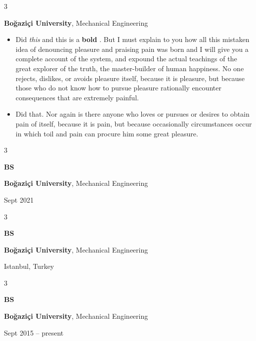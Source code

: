 \documentclass[10pt, letterpaper]{article}
\newenvironment{highlights}{
    \begin{itemize}[
        topsep=0.10 cm,
        parsep=0.10 cm,
        partopsep=0pt,
        itemsep=0pt,
        leftmargin=0.4 cm + 10pt
    ]
}{
    \end{itemize}
} %
\newenvironment{threecolentry}[3][]{
    \onecolentry
    \def\thirdColumn{#3}
    \setcolumnwidth{1 cm, \fill, 4.5 cm}
    \begin{paracol}{3}
    {\raggedright #2} \switchcolumn
}{
    \switchcolumn \raggedleft \thirdColumn
    \end{paracol}
    \endonecolentry
} %
\let\hrefWithoutArrow\href
\renewcommand{\href}[2]{\hrefWithoutArrow{#1}{\ifthenelse{\equal{#2}{}}{ }{#2 }\raisebox{.15ex}{\footnotesize \faExternalLink*}}}
\begin{document}
        \begin{threecolentry}{\textbf{}}{
            
        }
            \textbf{Boğaziçi University}, Mechanical Engineering
            \begin{highlights}
                \item Did \textit{this} and this is a \textbf{bold} \href{https://example.com}{link}. But I must explain to you how all this mistaken idea of denouncing pleasure and praising pain was born and I will give you a complete account of the system, and expound the actual teachings of the great explorer of the truth, the master-builder of human happiness. No one rejects, dislikes, or avoids pleasure itself, because it is pleasure, but because those who do not know how to pursue pleasure rationally encounter consequences that are extremely painful.
                \item Did that. Nor again is there anyone who loves or pursues or desires to obtain pain of itself, because it is pain, but because occasionally circumstances occur in which toil and pain can procure him some great pleasure.
            \end{highlights}
        \end{threecolentry}

        \vspace{0.2 cm}

        \begin{threecolentry}{\textbf{BS}}{
            Sept 2021
        }
            \textbf{Boğaziçi University}, Mechanical Engineering
        \end{threecolentry}

        \vspace{0.2 cm}

        \begin{threecolentry}{\textbf{BS}}{
            Istanbul, Turkey
        }
            \textbf{Boğaziçi University}, Mechanical Engineering
        \end{threecolentry}

        \vspace{0.2 cm}

        \begin{threecolentry}{\textbf{BS}}{
            Sept 2015 – present
        }
            \textbf{Boğaziçi University}, Mechanical Engineering
        \end{threecolentry}

        \vspace{0.2 cm}
\end{document}
